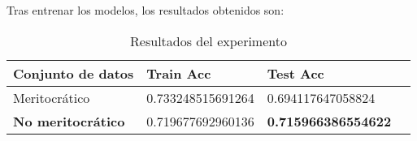 Tras entrenar los modelos, los resultados obtenidos son:

\begin{table}[H]
\centering
\begin{tabular}{|l|l|l|l}
\hline
Conjunto de datos    & Train Acc         & Test Acc              \\
\hline
Meritocrático        & 0.733248515691264 & 0.694117647058824     \\
    \textbf{No meritocrático} & 0.719677692960136 & \textbf{0.715966386554622} \\
\hline

\end{tabular}
\caption{Resultados del experimento}
\label{table:resultados_experimento}
\end{table}



